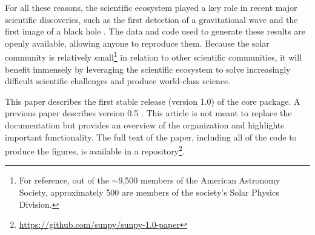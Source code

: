 For all these reasons, the scientific \python ecosystem played a key role in recent major scientific discoveries, such as the first detection of a gravitational wave \citep{ligo_scientific_collaboration_and_virgo_collaboration_observation_2016} and the first image of a black hole \citep{collaboration_first_2019}.
The data and code used to generate these results are openly available, allowing anyone to reproduce them.
Because the solar community is relatively small\footnote{For reference, out of the $\sim$9,500 members of the American Astronomy Society, approximately 500 are members of the society's Solar Physics Division.} in relation to other scientific communities, it will benefit immensely by leveraging the scientific \python ecosystem to solve increasingly difficult scientific challenges and produce world-class science.

This paper describes the first stable release (version 1.0) of the \sunpypkg core package.
A previous paper describes version 0.5 \citep{Community:2015cy}.
This article is not meant to replace the \sunpypkg documentation but provides an overview of the organization and highlights important functionality.
The full text of the paper, including all of the code to produce the figures, is available in a \github repository\footnote{\url{https://github.com/sunpy/sunpy-1.0-paper}}.
